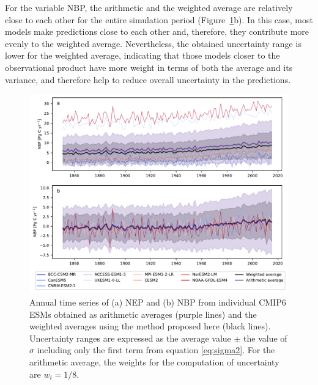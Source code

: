 \documentclass[gmd, manuscript]{copernicus}
\begin{document}
For the variable NBP, the arithmetic and the weighted average are relatively close to each other for the entire simulation period (Figure~\ref{fig:averages}b). In this case, most models make predictions close to each other and, therefore, they contribute more evenly to the weighted average. Nevertheless, the obtained uncertainty range is lower for the weighted average, indicating that those models closer to the observational product have more weight in terms of both the average and its variance, and therefore help to reduce overall uncertainty in the predictions. 


\begin{figure}[t]
   \centering
   \includegraphics[width=14cm]{Figures/Time_series_NXP_c1.pdf} %
   \caption{Annual time series of (a) NEP and (b) NBP from individual CMIP6 ESMs obtained as arithmetic averages (purple lines) and the weighted averages using the method proposed here (black lines). Uncertainty ranges are expressed as the average value $\pm$ the value of $\sigma$ including only the first term from equation \ref{eq:sigma2}. For the arithmetic average, the weights for the computation of uncertainty are $w_i = 1/8$.}
   \label{fig:averages}
\end{figure}
\end{document}
